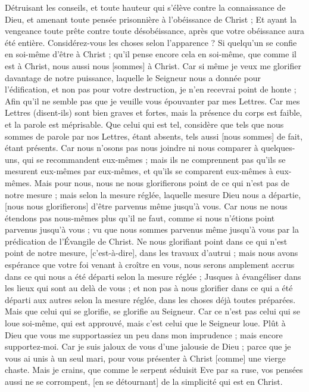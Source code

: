 \begin{multicols}{2}
Détruisant les conseils, et toute hauteur qui s'élève contre la connaissance de Dieu, et amenant toute pensée prisonnière à l'obéissance de Christ ;
Et ayant la vengeance toute prête contre toute désobéissance, après que votre obéissance aura été entière.
Considérez-vous les choses selon l'apparence ? Si quelqu'un se confie en soi-même d'être à Christ ; qu'il pense encore cela en soi-même, que comme il est à Christ, nous aussi nous [sommes] à Christ.
Car si même je veux me glorifier davantage de notre puissance, laquelle le Seigneur nous a donnée pour l'édification, et non pas pour votre destruction, je n'en recevrai point de honte ;
Afin qu'il ne semble pas que je veuille vous épouvanter par mes Lettres.
Car mes Lettres (disent-ils) sont bien graves et fortes, mais la présence du corps est faible, et la parole est méprisable.
Que celui qui est tel, considère que tels que nous sommes de parole par nos Lettres, étant absents, tels aussi [nous sommes] de fait, étant présents.
Car nous n'osons pas nous joindre ni nous comparer à quelques-uns, qui se recommandent eux-mêmes ; mais ils ne comprennent pas qu'ils se mesurent eux-mêmes par eux-mêmes, et qu'ils se comparent eux-mêmes à eux-mêmes.
Mais pour nous, nous ne nous glorifierons point de ce qui n'est pas de notre mesure ; mais selon la mesure réglée, laquelle mesure Dieu nous a départie, [nous nous glorifierons] d'être parvenus même jusqu'à vous.
Car nous ne nous étendons pas nous-mêmes plus qu'il ne faut, comme si nous n'étions point parvenus jusqu'à vous ; vu que nous sommes parvenus même jusqu'à vous par la prédication de l'Évangile de Christ.
Ne nous glorifiant point dans ce qui n'est point de notre mesure, [c'est-à-dire], dans les travaux d'autrui ; mais nous avons espérance que votre foi venant à croître en vous, nous serons amplement accrus dans ce qui nous a été départi selon la mesure réglée ;
Jusques à évangéliser dans les lieux qui sont au delà de vous ; et non pas à nous glorifier dans ce qui a été départi aux autres selon la mesure réglée, dans les choses déjà toutes préparées.
Mais que celui qui se glorifie, se glorifie au Seigneur.
Car ce n'est pas celui qui se loue soi-même, qui est approuvé, mais c'est celui que le Seigneur loue.
\VerseOne{}Plût à Dieu que vous me supportassiez un peu dans mon imprudence ; mais encore supportez-moi.
Car je suis jaloux de vous d'une jalousie de Dieu ; parce que je vous ai unis à un seul mari, pour vous présenter à Christ [comme] une vierge chaste.
Mais je crains, que comme le serpent séduisit Eve par sa ruse, vos pensées aussi ne se corrompent, [en se détournant] de la simplicité qui est en Christ.

\end{multicols}
